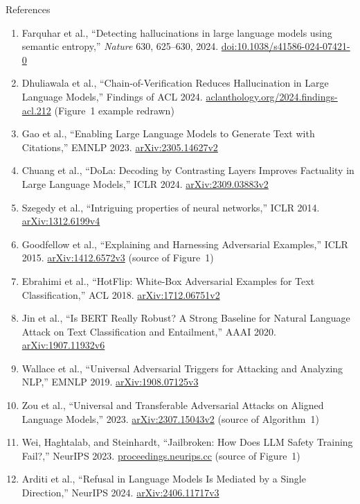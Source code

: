 \begin{frame}[allowframebreaks]{References}
\begin{enumerate}
    \item Farquhar et al., ``Detecting hallucinations in large language models using semantic entropy,'' \textit{Nature} 630, 625--630, 2024. \href{https://doi.org/10.1038/s41586-024-07421-0}{doi:10.1038/s41586-024-07421-0}
    \item Dhuliawala et al., ``Chain-of-Verification Reduces Hallucination in Large Language Models,'' Findings of ACL 2024. \href{https://aclanthology.org/2024.findings-acl.212/}{aclanthology.org/2024.findings-acl.212} (Figure~1 example redrawn)
    \item Gao et al., ``Enabling Large Language Models to Generate Text with Citations,'' EMNLP 2023. \href{https://arxiv.org/abs/2305.14627v2}{arXiv:2305.14627v2}
    \item Chuang et al., ``DoLa: Decoding by Contrasting Layers Improves Factuality in Large Language Models,'' ICLR 2024. \href{https://arxiv.org/abs/2309.03883v2}{arXiv:2309.03883v2}
    \item Szegedy et al., ``Intriguing properties of neural networks,'' ICLR 2014. \href{https://arxiv.org/abs/1312.6199v4}{arXiv:1312.6199v4}
    \item Goodfellow et al., ``Explaining and Harnessing Adversarial Examples,'' ICLR 2015. \href{https://arxiv.org/abs/1412.6572v3}{arXiv:1412.6572v3} (source of Figure~1)
    \item Ebrahimi et al., ``HotFlip: White-Box Adversarial Examples for Text Classification,'' ACL 2018. \href{https://arxiv.org/abs/1712.06751v2}{arXiv:1712.06751v2}
    \item Jin et al., ``Is BERT Really Robust? A Strong Baseline for Natural Language Attack on Text Classification and Entailment,'' AAAI 2020. \href{https://arxiv.org/abs/1907.11932v6}{arXiv:1907.11932v6}
    \item Wallace et al., ``Universal Adversarial Triggers for Attacking and Analyzing NLP,'' EMNLP 2019. \href{https://arxiv.org/abs/1908.07125v3}{arXiv:1908.07125v3}
    \item Zou et al., ``Universal and Transferable Adversarial Attacks on Aligned Language Models,'' 2023. \href{https://arxiv.org/abs/2307.15043v2}{arXiv:2307.15043v2} (source of Algorithm~1)
    \item Wei, Haghtalab, and Steinhardt, ``Jailbroken: How Does LLM Safety Training Fail?,'' NeurIPS 2023. \href{https://proceedings.neurips.cc/paper_files/paper/2023/hash/fd6613131889a4b656206c50a8bd7790-Abstract-Conference.html}{proceedings.neurips.cc} (source of Figure~1)
    \item Arditi et al., ``Refusal in Language Models Is Mediated by a Single Direction,'' NeurIPS 2024. \href{https://arxiv.org/abs/2406.11717v3}{arXiv:2406.11717v3}

\end{enumerate}
\end{frame}
